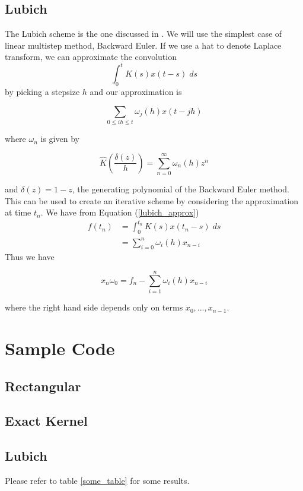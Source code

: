 \documentclass[11pt]{article}
\numberwithin{equation}{section}
\theoremstyle{definition}
\newcommand{\eqn}[2]{
  \begin{equation}
    \label{#1}
    #2
  \end{equation}
}
\newcommand{\eqr}[1]{Equation (\ref{#1})}
\begin{document}
\subsection{Lubich}
The Lubich scheme is the one discussed in \cite{lubich}. We will use the simplest
case of linear multistep method, Backward Euler. If we use a hat to denote Laplace
transform, we can approximate the convolution
$$
  \int_0^t K(s) x(t - s)\; ds
$$
by picking a stepsize $h$ and our approximation is
\eqn{lubich_approx}{
  \sum_{0 \leq ih \leq t} \omega_j(h) x(t - jh)
}
where $\omega_n$ is given by
\eqn{lubich_omega}{
  \hat{K}\left(\frac{\delta(z)}{h}\right) = \sum_{n=0}^\infty \omega_n(h) z^n
}
and $\delta(z) = 1-z$, the generating polynomial of the Backward Euler method.
This can be used to create an iterative scheme by considering the approximation
at time $t_n$. We have from \eqr{lubich_approx}
\begin{align}
\nonumber  f(t_n)
                  &= \int_0^{t_n} K(s) x(t_n - s)\; ds \\
                  &= \sum_{i=0}^{n} \omega_i(h) x_{n-i}
\end{align}
Thus we have
\eqn{lubich_scheme}{
  x_n \omega_0 = f_n - \sum_{i=1}^n \omega_i(h) x_{n-i}
}
where the right hand side depends only on terms $x_0, ..., x_{n-1}$.
\section{Sample Code}
\subsection{Rectangular}
\lstset{caption=Rectangular Scheme}

\subsection{Exact Kernel}
\lstset{caption=Exact Kernel Scheme}

\subsection{Lubich}
\lstset{caption=Lubich Scheme}

Please refer to table \ref{some_table} for some results.
\end{document}
